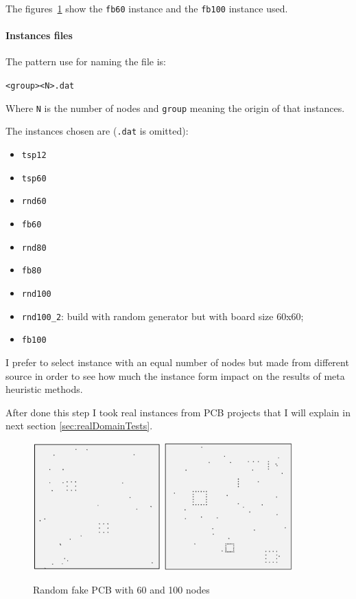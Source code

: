 	The figures~\ref{fig:fakeBoards} show the \verb|fb60| instance and the \verb|fb100| instance used.
	
\newpage
	\paragraph{Instances files}
	The pattern use for naming the file is:
	\begin{center}
		\verb|<group><N>.dat|
	\end{center}
	Where \verb|N| is the number of nodes and \verb|group| meaning the origin of that instances.
	
	The instances chosen are (\verb|.dat| is omitted):
	\begin{itemize}
		\item \verb|tsp12|
		\item \verb|tsp60|
		\item \verb|rnd60|
		\item \verb|fb60|
		\item \verb|rnd80|
		\item \verb|fb80|
		\item \verb|rnd100|
		\item \verb|rnd100_2|: build with random generator but with board size 60x60;
		\item \verb|fb100|
	\end{itemize}
	I prefer to select instance with an equal number of nodes but made from different source in order to see how much the instance form impact on the results of meta heuristic methods.
	
	After done this step I took real instances from PCB projects that I will explain in next section \ref{sec:realDomainTests}. 

	\begin{figure}[hb]
		\centering
		\includegraphics[width=0.44\textwidth]{img/fb60}%
		\qquad\qquad
		\includegraphics[width=0.44\textwidth]{img/fb100}
		\caption{Random fake PCB with 60 and 100 nodes}
		\label{fig:fakeBoards}
	\end{figure}

